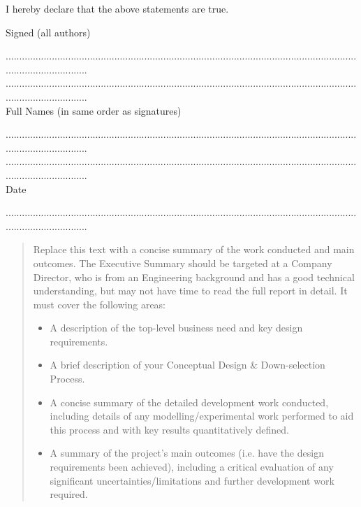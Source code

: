 \documentclass[a4paper, 10pt]{article}
\numberwithin{equation}{section}
\begin{document}
\hspace{0.25in} I hereby declare that the above statements are true.
\vspace{0.35in}

Signed (all authors)

\vspace{0.15in}
............................................................................................................................................................... \\
............................................................................................................................................................... \\

Full Names (in same order as signatures)

\vspace{0.15in}
............................................................................................................................................................... \\
............................................................................................................................................................... \\

Date

\vspace{0.15in}
...............................................................................................................................................................



\newpage
{}
\renewcommand{\abstractname}{Executive Summary}
\begin{abstract}
\setlength{\parskip}{1em}%
\setlength{\parindent}{0pt}
Replace this text with a concise summary of the work conducted and main outcomes. The Executive Summary should be targeted at a Company Director, who is from an Engineering background and has a good technical understanding, but may not have time to read the full report in detail. It must cover the following areas:

\begin{itemize}
    \item A description of the top-level business need and key design requirements.
    \item A brief description of your Conceptual Design \& Down-selection Process.
    \item A concise summary of the detailed development work conducted, including details of any modelling/experimental work performed to aid this process and with key results quantitatively defined. 
    \item A summary of the project’s main outcomes (i.e. have the design requirements been achieved), including a critical evaluation of any significant uncertainties/limitations and further development work required.
\end{itemize}

\end{abstract}
\end{document}
